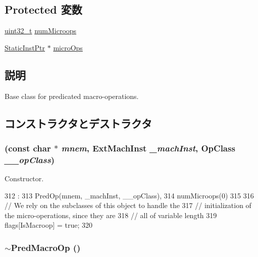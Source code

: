 \subsection*{Protected 変数}
\begin{DoxyCompactItemize}
\item 
\hyperlink{Type_8hh_a435d1572bf3f880d55459d9805097f62}{uint32\_\-t} \hyperlink{classArmISA_1_1PredMacroOp_a19b588f64e88c4ef1ef5fd836415e6f5}{numMicroops}
\item 
\hyperlink{classRefCountingPtr}{StaticInstPtr} $\ast$ \hyperlink{classArmISA_1_1PredMacroOp_a824cafc0dae7c0bbc33402c635074879}{microOps}
\end{DoxyCompactItemize}


\subsection{説明}
Base class for predicated macro-\/operations. 

\subsection{コンストラクタとデストラクタ}
\hypertarget{classArmISA_1_1PredMacroOp_a4d1de434734e67db31db5b479940c0cc}{
\subsubsection[{PredMacroOp}]{ (const char $\ast$ {\em mnem}, \/  {\bf ExtMachInst} {\em \_\-machInst}, \/  OpClass {\em \_\-\_\-opClass})}}
\label{classArmISA_1_1PredMacroOp_a4d1de434734e67db31db5b479940c0cc}


Constructor. 


\begin{DoxyCode}
312                                                                             :
313                 PredOp(mnem, _machInst, __opClass),
314                 numMicroops(0)
315     {
316         // We rely on the subclasses of this object to handle the
317         // initialization of the micro-operations, since they are
318         // all of variable length
319         flags[IsMacroop] = true;
320     }

\end{DoxyCode}
\hypertarget{classArmISA_1_1PredMacroOp_a33c257e43bb7ea10d1fc01b071da214c}{
\subsubsection[{$\sim$PredMacroOp}]{\setlength{\rightskip}{0pt plus 5cm}$\sim${\bf PredMacroOp} ()}}
\label{classArmISA_1_1PredMacroOp_a33c257e43bb7ea10d1fc01b071da214c}



